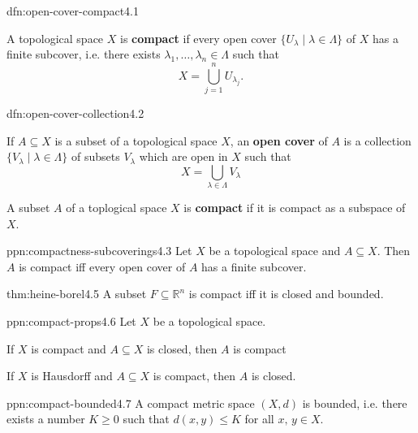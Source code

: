 \documentclass[landscape, 8pt]{extarticle}
\begin{document}
\begin{multicols}{3}
\begin{dfn}{dfn:open-cover-compact}{4.1}
\begin{enumerate-tight}
        \item A topological space $X$ is \textbf{compact} if every open cover $\{U_{\lambda} \mid \lambda\in\Lambda\}$ of $X$ has a finite subcover, i.e. there exists $\lambda_{1},\dots,\lambda_{n}\in \Lambda$ such that
            \[X = \bigcup_{j = 1}^{n} U_{\lambda_{j}}.\]
    \end{enumerate-tight}
\end{dfn}

\begin{dfn}{dfn:open-cover-collection}{4.2}
\begin{enumerate-tight}
\item If $A \subseteq X$ is a subset of a topological space $X$, an \textbf{open cover} of $A$ is a collection $\{V_{\lambda} \mid \lambda\in\Lambda\}$ of subsets $V_{\lambda}$ which are open in $X$ such that
\[X = \bigcup_{\lambda\in\Lambda}V_{\lambda}\]
\item A subset $A$ of a toplogical space $X$ is \textbf{compact} if it is compact as a subspace of $X$.
\end{enumerate-tight}
\end{dfn}

\begin{ppn}{ppn:compactness-subcoverings}{4.3}
    Let $X$ be a topological space and $A \subseteq X$. Then $A$ is compact iff every open cover of $A$ has a finite subcover.
\end{ppn}

\begin{thm}{thm:heine-borel}{4.5}
    A subset $F \subseteq \mathbb{R}^{n}$ is compact iff it is closed and bounded.
\end{thm}

\begin{ppn}{ppn:compact-props}{4.6}
    Let $X$ be a topological space.
    \begin{enumerate-tight}
        \item If $X$ is compact and $A \subseteq X$ is closed, then $A$ is compact
        \item If $X$ is Hausdorff and $A \subseteq X$ is compact, then $A$ is closed.
    \end{enumerate-tight}
\end{ppn}

\begin{ppn}{ppn:compact-bounded}{4.7}
    A compact metric space $(X, d)$ is bounded, i.e. there exists a number $K \ge 0$ such that $d(x,y) \le K$ for all $x,\,y\in X$.
\end{ppn}


\end{multicols}
\end{document}
